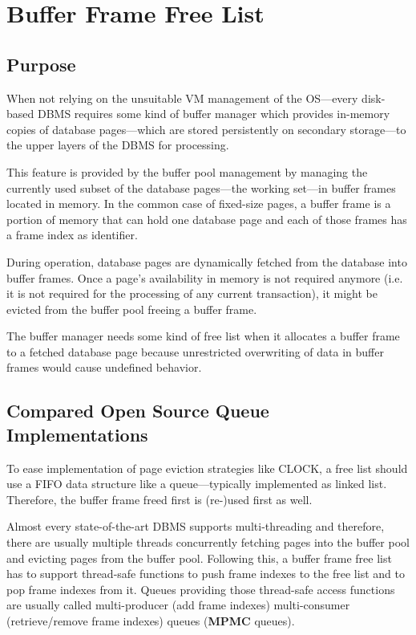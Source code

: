 \chapter[Buffer Frame Free List]{Buffer Frame Free List} \label{ch:free-list}

\section[Purpose]{Purpose}

	When not relying on the unsuitable VM management of the OS---every disk-based DBMS requires some kind of buffer manager which provides in-memory copies of database pages---which are stored persistently on secondary storage---to the upper layers of the DBMS for processing.
	
	This feature is provided by the buffer pool management by managing the currently used subset of the database pages---the working set---in buffer frames located in memory. In the common case of fixed-size pages, a buffer frame is a portion of memory that can hold one database page and each of those frames has a frame index as identifier.
	
	During operation, database pages are dynamically fetched from the database into buffer frames. Once a page's availability in memory is not required anymore (i.e. it is not required for the processing of any current transaction), it might be evicted from the buffer pool freeing a buffer frame.
	
	The buffer manager needs some kind of free list when it allocates a buffer frame to a fetched database page because unrestricted overwriting of data in buffer frames would cause undefined behavior.

\section[Compared Open Source Queue Implementations]{Compared Open Source Queue Implementations}

	To ease implementation of page eviction strategies like CLOCK, a free list should use a FIFO data structure like a queue---typically implemented as linked list. Therefore, the buffer frame freed first is (re-)used first as well.
	
	Almost every state-of-the-art DBMS supports multi-threading and therefore, there are usually multiple threads concurrently fetching pages into the buffer pool and evicting pages from the buffer pool. Following this, a buffer frame free list has to support thread-safe functions to push frame indexes to the free list and to pop frame indexes from it. Queues providing those thread-safe access functions are usually called multi-producer (add frame indexes) multi-consumer (retrieve/remove frame indexes) queues (\textbf{MPMC} queues).
	
